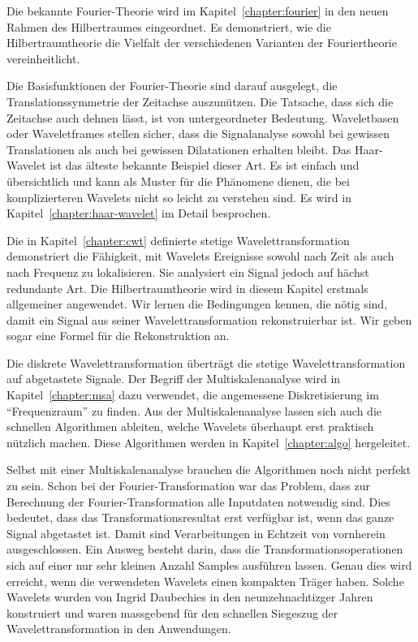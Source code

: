 Die bekannte Fourier-Theorie wird im Kapitel~\ref{chapter:fourier} in
den neuen Rahmen des Hilbertraumes eingeordnet.
Es demonstriert, wie die Hilbertraumtheorie die Vielfalt der 
verschiedenen Varianten der Fouriertheorie vereinheitlicht.

Die Basisfunktionen der Fourier-Theorie sind darauf ausgelegt,
die Translationssymmetrie der Zeitachse auszunützen.
Die Tatsache, dass sich die Zeitachse auch dehnen lässt, ist von
untergeordneter Bedeutung.
Waveletbasen oder Waveletframes stellen sicher, dass die Signalanalyse
sowohl bei gewissen Translationen als auch bei gewissen Dilatationen
erhalten bleibt.
%
%
Das Haar-Wavelet ist das älteste bekannte Beispiel dieser Art.
Es ist einfach und übersichtlich und kann als Muster für die
Phänomene dienen, die bei komplizierteren Wavelets nicht so leicht
zu verstehen sind.
Es wird in Kapitel~\ref{chapter:haar-wavelet} im Detail besprochen.

Die in Kapitel~\ref{chapter:cwt} definierte stetige Wavelettransformation
%
demonstriert die Fähigkeit, mit Wavelets Ereignisse sowohl nach Zeit
als auch nach Frequenz zu lokalisieren.
Sie analysiert ein Signal jedoch auf hächst redundante Art.
Die Hilbert\-raum\-theorie wird in diesem Kapitel erstmals allgemeiner
angewendet.
Wir lernen die Be\-ding\-ungen kennen, die nötig sind, damit ein Signal
aus seiner Wavelettransformation rekonstruierbar ist.
Wir geben sogar eine Formel für die Rekonstruktion an.

Die diskrete Wavelettransformation überträgt die stetige
Wavelettransformation auf abgetastete Signale.
Der Begriff der Multiskalenanalyse wird in Kapitel~\ref{chapter:msa}
dazu verwendet, die angemessene Diskretisierung im ``Frequenzraum''
zu finden.
Aus der Multiskalenanalyse lassen sich auch die schnellen Algorithmen
%
ableiten, welche Wavelets überhaupt erst praktisch nützlich machen.
Diese Algorithmen werden in Kapitel~\ref{chapter:algo} hergeleitet.

Selbst mit einer Multiskalenanalyse brauchen die Algorithmen noch nicht
perfekt zu sein.
Schon bei der Fourier-Transformation war das Problem, dass zur Berechnung
der Fourier-Trans\-for\-ma\-tion alle Inputdaten notwendig sind.
Dies bedeutet, dass das Transformationsresultat erst verfügbar ist,
wenn das ganze Signal abgetastet ist.
Damit sind Verarbeitungen in Echtzeit von vornherein ausgeschlossen.
Ein Ausweg besteht darin, dass die Transformationsoperationen sich auf
einer nur sehr kleinen Anzahl Samples ausführen lassen.
Genau dies wird erreicht, wenn die verwendeten Wavelets einen kompakten Träger
haben.
Solche Wavelets wurden von Ingrid Daubechies in den neunzehnachtizger
%
%
Jahren konstruiert und waren massgebend für den schnellen Siegeszug 
der Wavelettransformation in den Anwendungen.

